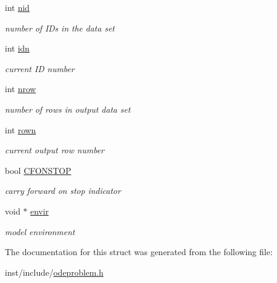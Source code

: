 \begin{DoxyCompactItemize}
\mbox{\label{structdatabox_a8b7d7bc8f934e7e440fc259cd8a574e0}} 
int \hyperlink{structdatabox_a8b7d7bc8f934e7e440fc259cd8a574e0}{nid}
\begin{DoxyCompactList}\small\item\em number of I\+Ds in the data set \end{DoxyCompactList}\item 
\mbox{\label{structdatabox_a16379e42a8f17101c58952c4bca77f08}} 
int \hyperlink{structdatabox_a16379e42a8f17101c58952c4bca77f08}{idn}
\begin{DoxyCompactList}\small\item\em current ID number \end{DoxyCompactList}\item 
\mbox{\label{structdatabox_ab0f63d0d0d4a515fb980aff77fae79d7}} 
int \hyperlink{structdatabox_ab0f63d0d0d4a515fb980aff77fae79d7}{nrow}
\begin{DoxyCompactList}\small\item\em number of rows in output data set \end{DoxyCompactList}\item 
\mbox{\label{structdatabox_ac2bc3b6910d4d4e8edc3098cd562dc89}} 
int \hyperlink{structdatabox_ac2bc3b6910d4d4e8edc3098cd562dc89}{rown}
\begin{DoxyCompactList}\small\item\em current output row number \end{DoxyCompactList}\item 
\mbox{\label{structdatabox_a0e7d419821cc9a52432cddb1a5a76224}} 
bool \hyperlink{structdatabox_a0e7d419821cc9a52432cddb1a5a76224}{C\+F\+O\+N\+S\+T\+OP}
\begin{DoxyCompactList}\small\item\em carry forward on stop indicator \end{DoxyCompactList}\item 
\mbox{\label{structdatabox_a0d75e74bf7b939fc239b04e23a2a6b76}} 
void $\ast$ \hyperlink{structdatabox_a0d75e74bf7b939fc239b04e23a2a6b76}{envir}
\begin{DoxyCompactList}\small\item\em model environment \end{DoxyCompactList}\end{DoxyCompactItemize}


The documentation for this struct was generated from the following file\+:\begin{DoxyCompactItemize}
\item 
inst/include/\hyperlink{odeproblem_8h}{odeproblem.\+h}\end{DoxyCompactItemize}
